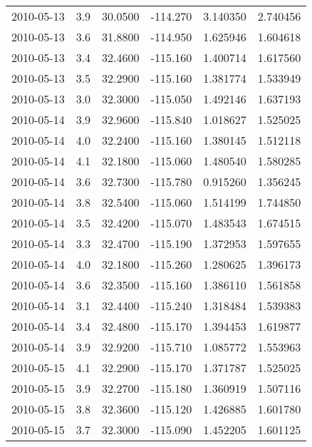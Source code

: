 \begin{tabular}{lrrrrr}
2010-05-13 &       3.9 &  30.0500 &  -114.270 &         3.140350 &         2.740456 \\
2010-05-13 &       3.6 &  31.8800 &  -114.950 &         1.625946 &         1.604618 \\
2010-05-13 &       3.4 &  32.4600 &  -115.160 &         1.400714 &         1.617560 \\
2010-05-13 &       3.5 &  32.2900 &  -115.160 &         1.381774 &         1.533949 \\
2010-05-13 &       3.0 &  32.3000 &  -115.050 &         1.492146 &         1.637193 \\
2010-05-14 &       3.9 &  32.9600 &  -115.840 &         1.018627 &         1.525025 \\
2010-05-14 &       4.0 &  32.2400 &  -115.160 &         1.380145 &         1.512118 \\
2010-05-14 &       4.1 &  32.1800 &  -115.060 &         1.480540 &         1.580285 \\
2010-05-14 &       3.6 &  32.7300 &  -115.780 &         0.915260 &         1.356245 \\
2010-05-14 &       3.8 &  32.5400 &  -115.060 &         1.514199 &         1.744850 \\
2010-05-14 &       3.5 &  32.4200 &  -115.070 &         1.483543 &         1.674515 \\
2010-05-14 &       3.3 &  32.4700 &  -115.190 &         1.372953 &         1.597655 \\
2010-05-14 &       4.0 &  32.1800 &  -115.260 &         1.280625 &         1.396173 \\
2010-05-14 &       3.6 &  32.3500 &  -115.160 &         1.386110 &         1.561858 \\
2010-05-14 &       3.1 &  32.4400 &  -115.240 &         1.318484 &         1.539383 \\
2010-05-14 &       3.4 &  32.4800 &  -115.170 &         1.394453 &         1.619877 \\
2010-05-14 &       3.9 &  32.9200 &  -115.710 &         1.085772 &         1.553963 \\
2010-05-15 &       4.1 &  32.2900 &  -115.170 &         1.371787 &         1.525025 \\
2010-05-15 &       3.9 &  32.2700 &  -115.180 &         1.360919 &         1.507116 \\
2010-05-15 &       3.8 &  32.3600 &  -115.120 &         1.426885 &         1.601780 \\
2010-05-15 &       3.7 &  32.3000 &  -115.090 &         1.452205 &         1.601125 \\

\end{tabular}
